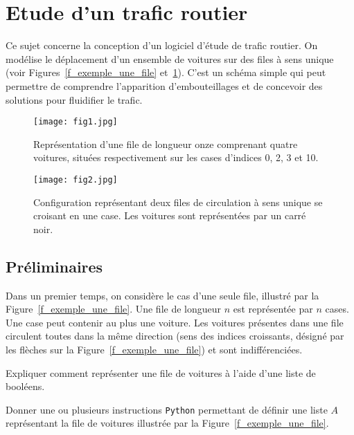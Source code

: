 \section{Etude d'un trafic routier}

Ce sujet concerne la conception d'un logiciel d'étude de trafic routier. On modélise le déplacement d'un ensemble de voitures sur des files à sens unique (voir Figures~\ref{f_exemple_une_file} et~\ref{f_exemple_deux_file}). C'est un
schéma simple qui peut permettre de comprendre l'apparition d'embouteillages et de concevoir des
solutions pour fluidifier le trafic.

\begin{figure}[!htb]
\begin{minipage}{0.45\textwidth}
\begin{center}
\texttt{[image: fig1.jpg]}
\caption{\label{f_exemple_une_file} Représentation d'une file de
longueur onze comprenant quatre voitures, situées
respectivement sur les cases d'indices 0, 2, 3 et 10.}
\end{center}
\end{minipage}
\begin{minipage}{0.45\textwidth}
\begin{center}
\texttt{[image: fig2.jpg]}
\caption{\label{f_exemple_deux_file} Configuration représentant deux files de circulation à sens unique se croisant en une case. Les voitures sont représentées par un carré noir.}
\end{center}
\end{minipage}
\end{figure}

\subsection{Préliminaires}



Dans un premier temps, on considère le cas d'une seule file, illustré par la Figure~\ref{f_exemple_une_file}. Une file de
longueur $n$ est représentée par $n$ cases. Une case peut contenir au plus une voiture. Les voitures
présentes dans une file circulent toutes dans la même direction (sens des indices croissants, désigné
par les flèches sur la Figure~\ref{f_exemple_une_file}) et sont indifférenciées.


\question{} Expliquer comment représenter une file de voitures à l'aide d'une liste de booléens.

\question{} Donner une ou plusieurs instructions \lstinline{Python} permettant de définir une liste $A$ représentant la file de voitures illustrée par la Figure~\ref{f_exemple_une_file}.


